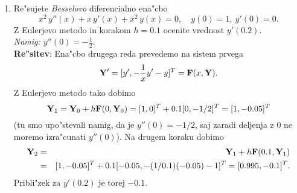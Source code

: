 \begin{enumerate}
  
  \item Re"sujete {\sl Besselovo} diferencialno ena"cbo
    $$x^2\,y''(x)+x\,y'(x)+x^2\,y(x)=0, \quad y(0)=1,\ y'(0)=0.$$
    Z Eulerjevo metodo in korakom $h=0.1$ ocenite vrednost
    $y'(0.2)$.\\
    {\sl Namig: $y''(0)=-\frac{1}{2}$}.\\
    {\bf Re"sitev}: Ena"cbo drugega reda prevedemo na sistem prvega
    $$\mathbf{Y}'=[y',-\frac{1}{x}y'-y]^T=\mathbf{F}(x,\mathbf{Y}).$$
    Z Eulerjevo metodo tako dobimo
    $$\mathbf{Y}_1=\mathbf{Y}_0+h\mathbf{F}(0,\mathbf{Y}_0)=[1,0]^T+0.1[0,-1/2]^T=[1,-0.05]^T$$
    (tu smo upo"stevali namig, da je $y''(0)=-1/2$, saj zaradi deljenja z $0$
    ne moremo izra"cunati $y''(0)$).
    Na drugem koraku dobimo
    \begin{eqnarray*}
    \mathbf{Y}_2&=&\mathbf{Y}_1+h\mathbf{F}(0.1,\mathbf{Y}_1)\\
     &=&[1,-0.05]^T
    +0.1[-0.05,-(1/0.1)(-0.05)-1]^T
    = [0.995,-0.1]^T.
    \end{eqnarray*}
    Pribli"zek za $y'(0.2)$ je torej $-0.1$.

\end{enumerate}
